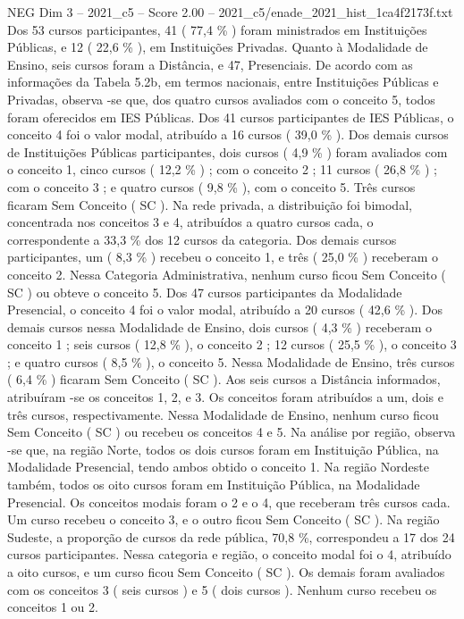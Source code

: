 \begin{textsample}{NEG Dim 3 – 2021\_c5 – Score 2.00 – 2021\_c5/enade\_2021\_hist\_1ca4f2173f.txt}
Dos 53 cursos participantes, 41 ( 77,4 \% ) foram ministrados em Instituições Públicas, e 12 ( 22,6 \% ), em Instituições Privadas.
Quanto à Modalidade de Ensino, seis cursos foram a Distância, e 47, Presenciais.
De acordo com as informações da Tabela 5.2b, em termos nacionais, entre Instituições Públicas e Privadas, observa -se que, dos quatro cursos avaliados com o conceito 5, todos foram oferecidos em IES Públicas.
Dos 41 cursos participantes de IES Públicas, o conceito 4 foi o valor modal, atribuído a 16 cursos ( 39,0 \% ).
Dos demais cursos de Instituições Públicas participantes, dois cursos ( 4,9 \% ) foram avaliados com o conceito 1, cinco cursos ( 12,2 \% ) ; com o conceito 2 ; 11 cursos ( 26,8 \% ) ; com o conceito 3 ; e quatro cursos ( 9,8 \% ), com o conceito 5.
Três cursos ficaram Sem Conceito ( SC ).
Na rede privada, a distribuição foi bimodal, concentrada nos conceitos 3 e 4, atribuídos a quatro cursos cada, o correspondente a 33,3 \% dos 12 cursos da categoria.
Dos demais cursos participantes, um ( 8,3 \% ) recebeu o conceito 1, e três ( 25,0 \% ) receberam o conceito 2.
Nessa Categoria Administrativa, nenhum curso ficou Sem Conceito ( SC ) ou obteve o conceito 5.
Dos 47 cursos participantes da Modalidade Presencial, o conceito 4 foi o valor modal, atribuído a 20 cursos ( 42,6 \% ).
Dos demais cursos nessa Modalidade de Ensino, dois cursos ( 4,3 \% ) receberam o conceito 1 ; seis cursos ( 12,8 \% ), o conceito 2 ; 12 cursos ( 25,5 \% ), o conceito 3 ; e quatro cursos ( 8,5 \% ), o conceito 5.
Nessa Modalidade de Ensino, três cursos ( 6,4 \% ) ficaram Sem Conceito ( SC ).
Aos seis cursos a Distância informados, atribuíram -se os conceitos 1, 2, e 3.
Os conceitos foram atribuídos a um, dois e três cursos, respectivamente.
Nessa Modalidade de Ensino, nenhum curso ficou Sem Conceito ( SC ) ou recebeu os conceitos 4 e 5.
Na análise por região, observa -se que, na região Norte, todos os dois cursos foram em Instituição Pública, na Modalidade Presencial, tendo ambos obtido o conceito 1.
Na região Nordeste também, todos os oito cursos foram em Instituição Pública, na Modalidade Presencial.
Os conceitos modais foram o 2 e o 4, que receberam três cursos cada.
Um curso recebeu o conceito 3, e o outro ficou Sem Conceito ( SC ).
Na região Sudeste, a proporção de cursos da rede pública, 70,8 \%, correspondeu a 17 dos 24 cursos participantes.
Nessa categoria e região, o conceito modal foi o 4, atribuído a oito cursos, e um curso ficou Sem Conceito ( SC ).
Os demais foram avaliados com os conceitos 3 ( seis cursos ) e 5 ( dois cursos ).
Nenhum curso recebeu os conceitos 1 ou 2.

\end{textsample}
